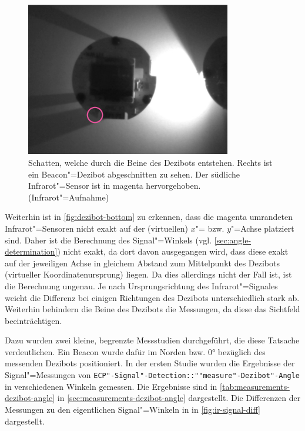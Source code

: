 \begin{figure}[h]
    \centering
    \includegraphics[width=0.8\textwidth]{../assets/dezibot_ir_shadow.png}
    \caption{Schatten, welche durch die Beine des Dezibots entstehen. Rechts ist ein Beacon"=Dezibot abgeschnitten zu sehen. Der südliche Infrarot"=Sensor ist in magenta hervorgehoben. (Infrarot"=Aufnahme)}
    \label{fig:dezibt-ir-shadow}
\end{figure}


Weiterhin ist in \autoref{fig:dezibot-bottom} zu erkennen, dass die magenta umrandeten Infrarot"=Sensoren nicht exakt auf der (virtuellen) $x$"= bzw. $y$"=Achse platziert sind. Daher ist die Berechnung des Signal"=Winkels (vgl. \autoref{sec:angle-determination}) nicht exakt, da dort davon ausgegangen wird, dass diese exakt auf der jeweiligen Achse in gleichem Abstand zum Mittelpunkt des Dezibots (virtueller Koordinatenursprung) liegen. Da dies allerdings nicht der Fall ist, ist die Berechnung ungenau. Je nach Ursprungsrichtung des Infrarot"=Signales weicht die Differenz bei einigen Richtungen des Dezibots unterschiedlich stark ab. Weiterhin behindern die Beine des Dezibots die Messungen, da diese das Sichtfeld beeinträchtigen.

Dazu wurden zwei kleine, begrenzte Messstudien durchgeführt, die diese Tatsache verdeutlichen. Ein Beacon wurde dafür im Norden bzw. 0° bezüglich des messenden Dezibots positioniert. In der ersten Studie wurden die Ergebnisse der Signal"=Messungen von \texttt{ECP"-Signal"-Detection::""measure"-Dezibot"-Angle} in verschiedenen Winkeln gemessen. Die Ergebnisse sind in \autoref{tab:measurements-dezibot-angle} in \autoref{sec:measurements-dezibot-angle} dargestellt. Die Differenzen der Messungen zu den eigentlichen Signal"=Winkeln in in \autoref{fig:ir-signal-diff} dargestellt.


